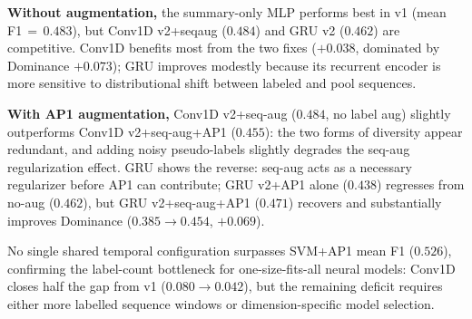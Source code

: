 \documentclass[sigconf,nonacm]{acmart}
\begin{document}
\textbf{Without augmentation,} the summary-only MLP performs best in v1
(mean F1\,$=$\,$0.483$), but Conv1D v2+seqaug ($0.484$) and GRU v2 ($0.462$)
are competitive.
Conv1D benefits most from the two fixes ($+0.038$, dominated by Dominance
$+0.073$); GRU improves modestly because its recurrent encoder is more
sensitive to distributional shift between labeled and pool sequences.

\textbf{With AP1 augmentation,}
Conv1D v2+seq-aug ($0.484$, no label aug) slightly outperforms
Conv1D v2+seq-aug+AP1 ($0.455$): the two forms of diversity appear
redundant, and adding noisy pseudo-labels slightly degrades the
seq-aug regularization effect.
GRU shows the reverse: seq-aug acts as a necessary regularizer
before AP1 can contribute; GRU v2+AP1 alone ($0.438$) regresses from
no-aug ($0.462$), but GRU v2+seq-aug+AP1 ($0.471$) recovers and
substantially improves Dominance ($0.385\rightarrow0.454$, $+0.069$).

No single shared temporal configuration surpasses SVM+AP1 mean F1 ($0.526$),
confirming the label-count bottleneck for one-size-fits-all neural models:
Conv1D closes half the gap from v1 ($0.080\rightarrow0.042$), but the
remaining deficit requires either more labelled sequence windows or
dimension-specific model selection.
\end{document}
